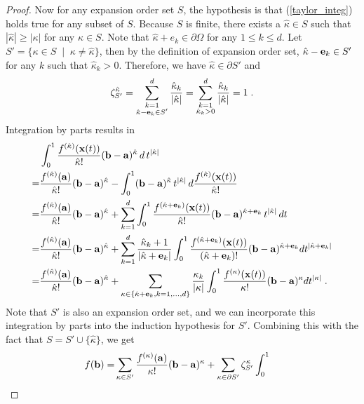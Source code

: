 \begin{proof}
Now for any expansion order set $S$, the hypothesis is that
(\ref{taylor_integ}) holds true for any subset of $S$.
Because $S$ is finite,
there exists a ${\hat\kappa}\in S$ such that $|{\hat\kappa}|\ge |\kappa|$ for
any $\kappa\in S$.  Note that ${\hat\kappa} + e_k \in \partial \Omega$ for
any $1\le k\le d$.  Let $S' = \{ \kappa\in S \;\mid\; \kappa\ne{\hat\kappa}\}$,
then by the definition of expansion order set, ${\hat\kappa}-\mathbf{e}_k\in S'$ for
any $k$ such that ${\hat\kappa}_k>0$.  Therefore, we have
${\hat\kappa}\in \partial S'$ and
\[ \zeta^{\hat\kappa}_{S'} = \sum_{\substack{k=1\\ {\hat\kappa}-\mathbf{e}_k\in S'}}^d
                            \frac{{\hat\kappa}_k}{|{\hat\kappa}|}
                          = \sum_{\substack{k=1\\ {\hat\kappa}_k>0}}^d
                            \frac{{\hat\kappa}_k}{|{\hat\kappa}|} = 1 \;.\]
Integration by parts results in
\[\begin{split}
&  \int_0^1 \frac{f^{({\hat\kappa})}(\mathbf{x}(t))}{{\hat\kappa}!}
   (\mathbf{b}-\mathbf{a})^{\hat\kappa} \,d\,t^{|{\hat\kappa}|} \\
=& \frac{f^{({\hat\kappa})}(\mathbf{a})}{{\hat\kappa}!} (\mathbf{b}-\mathbf{a})^{\hat\kappa}
 - \int_0^1 (\mathbf{b}-\mathbf{a})^{\hat\kappa} \,t^{|{\hat\kappa}|}
   \,d \frac{f^{({\hat\kappa})}(\mathbf{x}(t))}{{\hat\kappa}!} \\
=& \frac{f^{({\hat\kappa})}(\mathbf{a})}{{\hat\kappa}!} (\mathbf{b}-\mathbf{a})^{\hat\kappa}
 + \sum_{k=1}^d \int_0^1 \frac{f^{({\hat\kappa}+\mathbf{e}_k)}(\mathbf{x}(t))}{{\hat\kappa}!}
   (\mathbf{b}-\mathbf{a})^{{\hat\kappa}+\mathbf{e}_k} \,t^{|{\hat\kappa}|} \,dt \\
=& \frac{f^{({\hat\kappa})}(\mathbf{a})}{{\hat\kappa}!} (\mathbf{b}-\mathbf{a})^{\hat\kappa}
 + \sum_{k=1}^d \frac{{\hat\kappa}_k+1}{|{\hat\kappa}+\mathbf{e}_k|} \int_0^1
   \frac{f^{({\hat\kappa}+\mathbf{e}_k)}(\mathbf{x}(t))} {({\hat\kappa}+\mathbf{e}_k)!}
   (\mathbf{b}-\mathbf{a})^{{\hat\kappa}+\mathbf{e}_k} dt^{|{\hat\kappa}+\mathbf{e}_k|} \\
=& \frac{f^{({\hat\kappa})}(\mathbf{a})}{{\hat\kappa}!} (\mathbf{b}-\mathbf{a})^{\hat\kappa}
 + \sum_{\kappa\in \{{\hat\kappa}+\mathbf{e}_k,k=1,\ldots,d\}} \frac{\kappa_k}{|\kappa|}
   \int_0^1 \frac{f^{(\kappa)}(\mathbf{x}(t))} {\kappa!} (\mathbf{b}-\mathbf{a})^{\kappa} dt^{|\kappa|}
\;.
\end{split}\]
Note that $S'$ is also an expansion order set, and we can
incorporate this integration by parts into the induction hypothesis for $S'$.
Combining this with the fact that $S = S' \cup \{{\hat\kappa}\}$, we get
\[\begin{split}
f(\b) =& \sum_{\kappa\in S'} \frac{f^{(\kappa)}(\a)}{\kappa!} (\b-\a)^\kappa
      + \sum_{\kappa\in \partial S'} \zeta^\kappa_{S'} \int_0^1

\end{split}\]
\end{proof}
